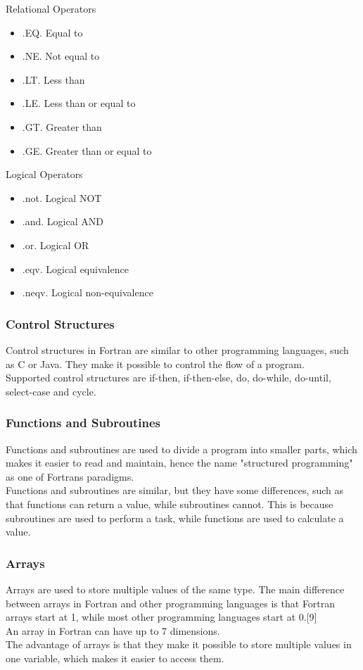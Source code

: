 \documentclass[12pt,a4paper]{scrartcl}
\begin{document}
Relational Operators
\begin{itemize}
\item .EQ. Equal to
\item .NE. Not equal to
\item .LT. Less than
\item .LE. Less than or equal to
\item .GT. Greater than
\item .GE. Greater than or equal to
\end{itemize}

Logical Operators
\begin{itemize}
\item .not. Logical NOT
\item .and. Logical AND
\item .or. Logical OR
\item .eqv. Logical equivalence
\item .neqv. Logical non-equivalence
\end{itemize}

\subsubsection{Control Structures}
Control structures in Fortran are similar to other programming languages, such as C or Java. They make it possible to control the flow of a program.\\
Supported control structures are if-then, if-then-else, do, do-while, do-until, select-case and cycle.\\


\subsubsection{Functions and Subroutines}
Functions and subroutines are used to divide a program into smaller parts, which makes it easier to read and maintain, hence the name "structured programming" as one of Fortrans paradigms.\\
Functions and subroutines are similar, but they have some differences, such as that functions can return a value, while subroutines cannot. This is because subroutines are used to perform a task, while functions are used to calculate a value.\\

\subsubsection{Arrays}
Arrays are used to store multiple values of the same type. The main difference between arrays in Fortran and other programming languages is that Fortran arrays start at 1, while most other programming languages start at 0.[9]\\
An array in Fortran can have up to 7 dimensions.\\
The advantage of arrays is that they make it possible to store multiple values in one variable, which makes it easier to access them.\\
\end{document}
